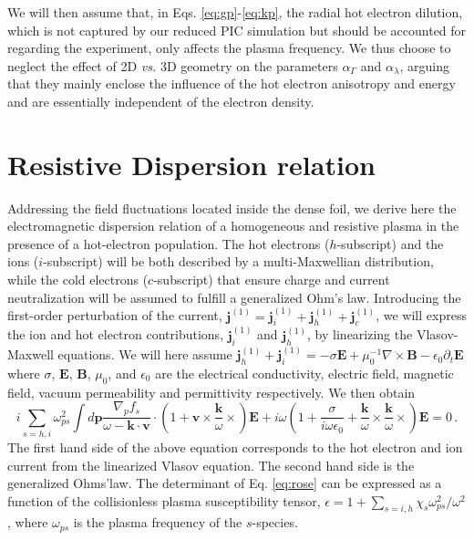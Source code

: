 \documentclass[aps,showpacs,superscriptaddress]{revtex4}
\begin{document}
We will then assume that, in Eqs. \eqref{eq:gp}-\eqref{eq:kp},  the radial hot electron dilution, which is not captured by our reduced PIC simulation but should be accounted for regarding the experiment, only affects the plasma frequency. 
We thus choose to neglect the effect of 2D \emph{vs.} 3D geometry  on the parameters $\alpha_\Gamma$ and $\alpha_\lambda$,  arguing that they mainly enclose the influence of the hot electron anisotropy and energy and are essentially independent of the electron density.

\section{Resistive Dispersion relation} \label{sec:dispe_res}
Addressing the field fluctuations located inside the dense foil, 
we derive here the electromagnetic dispersion relation of a homogeneous and resistive plasma in the presence of a hot-electron population. The hot electrons ($h$-subscript) and the ions ($i$-subscript) will be both  described by a multi-Maxwellian distribution, while the cold electrons ($c$-subscript) that ensure charge and current neutralization will be assumed to fulfill a generalized Ohm's law. Introducing the first-order perturbation of the  current, $\mathbf{j}^{(1)} = \mathbf{j}_i^{(1)} +\mathbf{j}_h^{(1)}+\mathbf{j}_c^{(1)}$, we will express the ion and hot electron contributions, $\mathbf{j}_i^{(1)}$ and $\mathbf{j}_h^{(1)}$, by linearizing the Vlasov-Maxwell equations.
We will here assume  $\mathbf{j}_h^{(1)} +\mathbf{j}_i^{(1)} =- \sigma \mathbf{E} +\mu_0^{-1}\nabla \times \mathbf{B} - \epsilon_0 \partial_t \mathbf{E}$ where $\sigma$, $\mathbf{E}$, $\mathbf{B}$, $\mu_0$, and $\epsilon_0$ are the electrical conductivity,  electric field, magnetic field, vacuum permeability and permittivity respectively.
We then obtain 
\begin{equation}\label{eq:rose}
i \sum_{s =h,i} \omega_{ps}^2 \int d\mathbf{p} \frac{\nabla_pf_s}{\omega -\mathbf{k}\cdot\mathbf{v}}\cdot \left( 1 +\mathbf{v}\times \frac{\mathbf{k}}{\omega} \times \right)\mathbf{E}
+ i\omega \left( 1 + \frac{\sigma }{i\omega \epsilon_0}+ \frac{\mathbf{k}}{\omega}\times \frac{\mathbf{k}}{\omega} \times \right)\mathbf{E} =0 \, .
\end{equation}
The first hand side of the above equation corresponds to the hot electron and ion current from the linearized Vlasov equation. The second hand side is the generalized Ohms'law.
The determinant of Eq. \eqref{eq:rose} can be expressed as a function of the  collisionless  plasma susceptibility tensor, $\epsilon =  1 + \sum_{s = i,h} \chi_s\omega_{ps}^2/\omega^2$, where $\omega_{ps}$ is the plasma frequency of the $s$-species.
\end{document}
